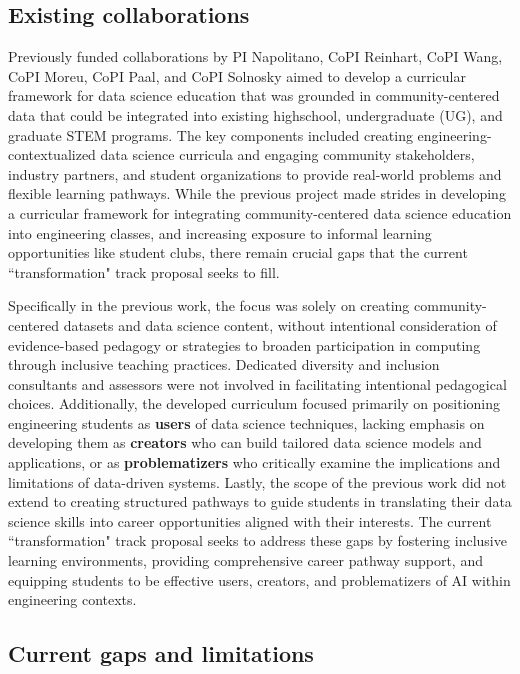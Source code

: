 \documentclass[11pt]{article}
\begin{document}
\subsection{Existing collaborations}
Previously funded collaborations by PI Napolitano, CoPI Reinhart, CoPI Wang, CoPI Moreu, CoPI Paal, and CoPI Solnosky aimed to develop a curricular framework for data science education that was grounded in community-centered data that could be integrated into existing highschool, undergraduate (UG), and graduate STEM programs.
The key components included creating engineering-contextualized data science curricula and engaging community stakeholders, industry partners, and student organizations to provide real-world problems and flexible learning pathways.
While the previous project made strides in developing a curricular framework for integrating community-centered data science education into engineering classes, and increasing exposure to informal learning opportunities like student clubs, there remain crucial gaps that the current ``transformation" track proposal seeks to fill. 

Specifically in the previous work, the focus was solely on creating community-centered datasets and data science content, without intentional consideration of evidence-based pedagogy or strategies to broaden participation in computing through inclusive teaching practices. 
Dedicated diversity and inclusion consultants and assessors were not involved in facilitating intentional pedagogical choices.
Additionally, the developed curriculum focused primarily on positioning engineering students as \textbf{users} of data science techniques, lacking emphasis on developing them as \textbf{creators} who can build tailored data science models and applications, or as \textbf{problematizers} who critically examine the implications and limitations of data-driven systems.
Lastly, the scope of the previous work did not extend to creating structured pathways to guide students in translating their data science skills into career opportunities aligned with their interests.
The current ``transformation" track proposal seeks to address these gaps by fostering inclusive learning environments, providing comprehensive career pathway support, and equipping students to be effective users, creators, and problematizers of AI within engineering contexts.

\subsection{Current gaps and limitations}
\end{document}
